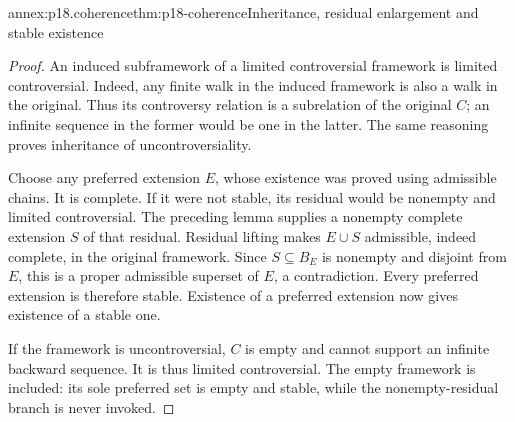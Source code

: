 \begin{annexitem}{annex:p18.coherence}{thm:p18-coherence}{Inheritance, residual enlargement and stable existence}
\begin{proof}
An induced subframework of a
limited controversial framework
is limited controversial.
Indeed, any finite walk in
the induced framework is
also a walk in the original.
Thus its controversy relation
is a subrelation of the
original \(C\); an infinite
sequence in the former would
be one in the latter.
The same reasoning proves
inheritance of uncontroversiality.

Choose any preferred extension
\(E\), whose existence was
proved using admissible chains.
It is complete. If it
were not stable, its residual
would be nonempty and
limited controversial.
The preceding lemma supplies
a nonempty complete extension
\(S\) of that residual.
Residual lifting makes
\(E\cup S\) admissible,
indeed complete, in the
original framework.
Since \(S\subseteq B_E\)
is nonempty and disjoint
from \(E\), this is a
proper admissible superset
of \(E\), a contradiction.
Every preferred extension
is therefore stable.
Existence of a preferred
extension now gives existence
of a stable one.

If the framework is
uncontroversial, \(C\) is
empty and cannot support
an infinite backward
sequence. It is thus
limited controversial.
The empty framework is
included: its sole preferred
set is empty and stable,
while the nonempty-residual
branch is never invoked.
\end{proof}
\end{annexitem}

